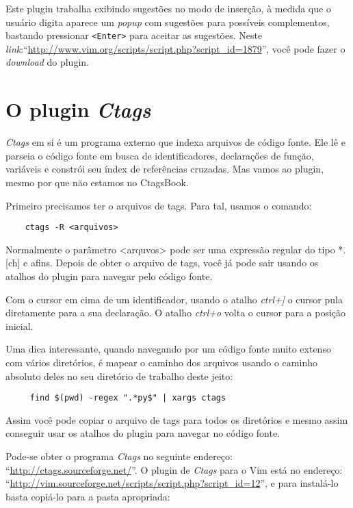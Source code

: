 Este plugin trabalha exibindo sugestões no modo de inserção, à
medida que o usuário digita aparece um {\em popup} com sugestões para possíveis
complementos, bastando pressionar {\tt <Enter>} para aceitar as sugestões.
Neste {\em link}:``\url{http://www.vim.org/scripts/script.php?script_id=1879}'', você pode
fazer o {\em download} do plugin.

\section{O plugin {\em Ctags}}
\label{sec:O Plugin Ctags}

{\em Ctags} em si é um programa externo que indexa arquivos de código fonte. Ele lê e parseia
o código fonte em busca de identificadores, declaraçőes de funçăo, variáveis e constrói seu 
índex de referências cruzadas. Mas vamos ao plugin, mesmo por que năo estamos no CtagsBook.

Primeiro precisamos ter o arquivos de tags. Para tal, usamos o comando:

\begin{verbatim}
    ctags -R <arquivos>
\end{verbatim}

Normalmente o parâmetro <arquvos> pode ser uma expressão regular do tipo *.[ch] e afins. Depois
de obter o arquivo de tags, você já pode sair usando os atalhos do plugin para navegar pelo 
código fonte. 

Com o cursor em cima de um identificador, usando o atalho {\em ctrl+]} o cursor pula diretamente 
para a sua declaração. O atalho {\em ctrl+o} volta o cursor para a posição inicial.

Uma dica interessante, quando navegando por um código fonte muito extenso com vários diretórios, 
é mapear o caminho dos arquivos usando o caminho absoluto deles no seu diretório de trabalho 
deste jeito:

\begin{verbatim}
     find $(pwd) -regex ".*py$" | xargs ctags
\end{verbatim}

Assim você pode copiar o arquivo de tags para todos os diretórios e mesmo assim conseguir usar 
os atalhos do plugin para navegar no código fonte.

Pode-se obter o programa {\em Ctags} no seguinte endereço: 
``\url{http://ctags.sourceforge.net/}''. O plugin de {\em Ctags} para o Vim está no endereço: 
``\url{http://vim.sourceforge.net/scripts/script.php?script_id=12}'', 
e para instalá-lo basta copiá-lo para a pasta apropriada:
    

